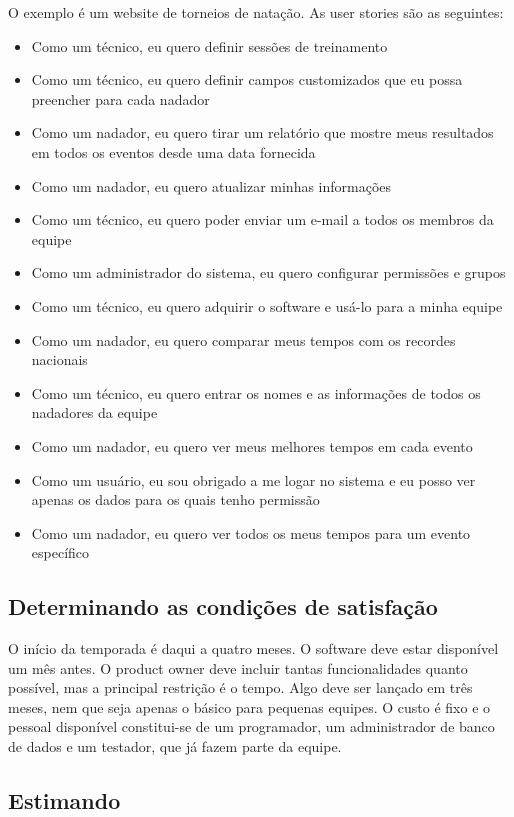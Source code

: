 \documentclass[a4paper,abntfigtabnum,noindentfirst]{abnt}
\begin{document}
O exemplo é um website de torneios de natação. As user stories são as seguintes:
\begin{itemize}
\item Como um técnico, eu quero definir sessões de treinamento
\item Como um técnico, eu quero definir campos customizados que eu possa preencher para cada nadador
\item Como um nadador, eu quero tirar um relatório que mostre meus resultados em todos os eventos desde uma data fornecida
\item Como um nadador, eu quero atualizar minhas informações
\item Como um técnico, eu quero poder enviar um e-mail a todos os membros da equipe
\item Como um administrador do sistema, eu quero configurar permissões e grupos
\item Como um técnico, eu quero adquirir o software e usá-lo para a minha equipe
\item Como um nadador, eu quero comparar meus tempos com os recordes nacionais
\item Como um técnico, eu quero entrar os nomes e as informações de todos os nadadores da equipe
\item Como um nadador, eu quero ver meus melhores tempos em cada evento
\item Como um usuário, eu sou obrigado a me logar no sistema e eu posso ver apenas os dados para os quais tenho permissão
\item Como um nadador, eu quero ver todos os meus tempos para um evento específico
\end{itemize}

\subsection{Determinando as condições de satisfação}

O início da temporada é daqui a quatro meses. O software deve estar disponível um mês antes. O product owner deve incluir tantas funcionalidades quanto possível, mas a principal restrição é o tempo. Algo deve ser lançado em três meses, nem que seja apenas o básico para pequenas equipes. O custo é fixo e o pessoal disponível constitui-se de um programador, um administrador de banco de dados e um testador, que já fazem parte da equipe.

\subsection{Estimando}
\end{document}
